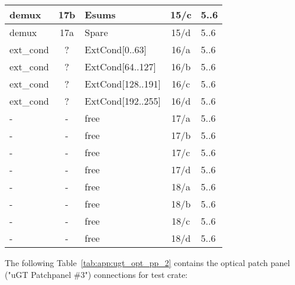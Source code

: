 \begin{longtable}{|l|c|l|c|l|}
demux & 17b & Esums      & 15/c & 5..6 \\\hline
demux & 17a & Spare      & 15/d & 5..6 \\\hline
ext\_cond & ?   & ExtCond[0..63]    & 16/a & 5..6 \\\hline
ext\_cond & ?   & ExtCond[64..127]  & 16/b & 5..6 \\\hline
ext\_cond & ?   & ExtCond[128..191] & 16/c & 5..6 \\\hline
ext\_cond & ?   & ExtCond[192..255] & 16/d & 5..6 \\\hline
- & - & free & 17/a & 5..6 \\\hline
- & - & free & 17/b & 5..6 \\\hline
- & - & free & 17/c & 5..6 \\\hline
- & - & free & 17/d & 5..6 \\\hline
- & - & free & 18/a & 5..6 \\\hline
- & - & free & 18/b & 5..6 \\\hline
- & - & free & 18/c & 5..6 \\\hline
- & - & free & 18/d & 5..6 \\\hline
\end{longtable}

The following Table~\ref{tab:app:ugt_opt_pp_2} contains the optical patch panel ("uGT Patchpanel \#3") connections for test crate:

